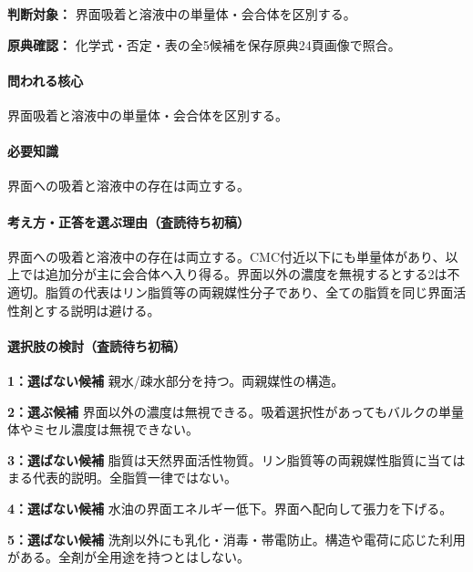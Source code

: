 \noindent\textbf{判断対象：} 界面吸着と溶液中の単量体・会合体を区別する。\par

\noindent\textbf{原典確認：} 化学式・否定・表の全5候補を保存原典24頁画像で照合。\par

\paragraph{問われる核心} 界面吸着と溶液中の単量体・会合体を区別する。

\paragraph{必要知識} 界面への吸着と溶液中の存在は両立する。

\paragraph{考え方・正答を選ぶ理由（査読待ち初稿）} 界面への吸着と溶液中の存在は両立する。CMC付近以下にも単量体があり、以上では追加分が主に会合体へ入り得る。界面以外の濃度を無視するとする2は不適切。脂質の代表はリン脂質等の両親媒性分子であり、全ての脂質を同じ界面活性剤とする説明は避ける。

\paragraph{選択肢の検討（査読待ち初稿）}\mbox{}\par

\noindent\textbf{1：選ばない候補} 親水/疎水部分を持つ。両親媒性の構造。\par

\noindent\textbf{2：選ぶ候補} 界面以外の濃度は無視できる。吸着選択性があってもバルクの単量体やミセル濃度は無視できない。\par

\noindent\textbf{3：選ばない候補} 脂質は天然界面活性物質。リン脂質等の両親媒性脂質に当てはまる代表的説明。全脂質一律ではない。\par

\noindent\textbf{4：選ばない候補} 水油の界面エネルギー低下。界面へ配向して張力を下げる。\par

\noindent\textbf{5：選ばない候補} 洗剤以外にも乳化・消毒・帯電防止。構造や電荷に応じた利用がある。全剤が全用途を持つとはしない。\par

